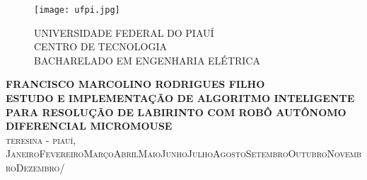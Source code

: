 \pagestyle{empty}


\renewcommand{\today}{\ifcase \month \or Janeiro\or Fevereiro\or Março\or Abril\or Maio\or Junho\or Julho\or Agosto\or Setembro\or Outubro\or Novembro\or Dezembro\fi/\number \year}
\begin{center}
\begin{figure}[h!]
\parbox{2.5cm}{\texttt{[image: ufpi.jpg]}}%
\quad
\begin{minipage}{12cm}%
\vspace{1cm}
\textsc{\large UNIVERSIDADE FEDERAL DO PIAUÍ}\\
\textsc{\large CENTRO DE TECNOLOGIA}\\
\textsc{\large BACHARELADO EM ENGENHARIA ELÉTRICA}\\
\end{minipage} %
\end{figure}
\vspace{4cm}
\textbf{\large FRANCISCO MARCOLINO RODRIGUES FILHO}\\
\vspace{4cm}
\textbf{\large ESTUDO E IMPLEMENTAÇÃO DE ALGORITMO INTELIGENTE PARA RESOLUÇÃO DE LABIRINTO COM ROBÔ AUTÔNOMO DIFERENCIAL MICROMOUSE}\\
\vfill
\textsc{\large teresina - piauí, \today}\\
\end{center}
\clearpage


